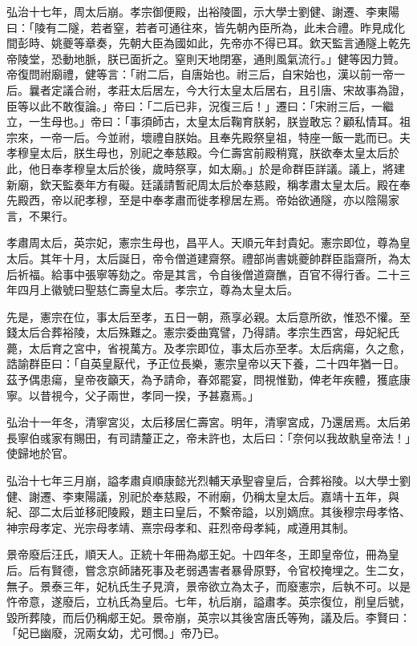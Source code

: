弘治十七年，周太后崩。孝宗御便殿，出裕陵圖，示大學士劉健、謝遷、李東陽曰：「陵有二隧，若者窒，若者可通往來，皆先朝內臣所為，此未合禮。昨見成化間彭時、姚夔等章奏，先朝大臣為國如此，先帝亦不得已耳。欽天監言通隧上乾先帝陵堂，恐動地脈，朕已面折之。窒則天地閉塞，通則風氣流行。」健等因力贊。帝復問祔廟禮，健等言：「祔二后，自唐始也。祔三后，自宋始也，漢以前一帝一后。曩者定議合祔，孝莊太后居左，今大行太皇太后居右，且引唐、宋故事為證，臣等以此不敢復論。」帝曰：「二后已非，況復三后！」遷曰：「宋祔三后，一繼立，一生母也。」帝曰：「事須師古，太皇太后鞠育朕躬，朕豈敢忘？顧私情耳。祖宗來，一帝一后。今並祔，壞禮自朕始。且奉先殿祭皇祖，特座一飯一匙而已。夫孝穆皇太后，朕生母也，別祀之奉慈殿。今仁壽宮前殿稍寬，朕欲奉太皇太后於此，他日奉孝穆皇太后於後，歲時祭享，如太廟。」於是命群臣詳議。議上，將建新廟，欽天監奏年方有礙。廷議請暫祀周太后於奉慈殿，稱孝肅太皇太后。殿在奉先殿西，帝以祀孝穆，至是中奉孝肅而徙孝穆居左焉。帝始欲通隧，亦以陰陽家言，不果行。

孝肅周太后，英宗妃，憲宗生母也，昌平人。天順元年封貴妃。憲宗即位，尊為皇太后。其年十月，太后誕日，帝令僧道建齋祭。禮部尚書姚夔帥群臣詣齋所，為太后祈福。給事中張寧等劾之。帝是其言，令自後僧道齋醮，百官不得行香。二十三年四月上徽號曰聖慈仁壽皇太后。孝宗立，尊為太皇太后。

先是，憲宗在位，事太后至孝，五日一朝，燕享必親。太后意所欲，惟恐不懽。至錢太后合葬裕陵，太后殊難之。憲宗委曲寬譬，乃得請。孝宗生西宮，母妃紀氏薨，太后育之宮中，省視萬方。及孝宗即位，事太后亦至孝。太后病瘍，久之愈，誥諭群臣曰：「自英皇厭代，予正位長樂，憲宗皇帝以天下養，二十四年猶一日。茲予偶患瘍，皇帝夜籲天，為予請命，春郊罷宴，問視惟勤，俾老年疾體，獲底康寧。以昔視今，父子兩世，孝同一揆，予甚嘉焉。」

弘治十一年冬，清寧宮災，太后移居仁壽宮。明年，清寧宮成，乃還居焉。太后弟長寧伯彧家有賜田，有司請釐正之，帝未許也，太后曰：「奈何以我故骫皇帝法！」使歸地於官。

弘治十七年三月崩，謚孝肅貞順康懿光烈輔天承聖睿皇后，合葬裕陵。以大學士劉健、謝遷、李東陽議，別祀於奉慈殿，不祔廟，仍稱太皇太后。嘉靖十五年，與紀、邵二太后並移祀陵殿，題主曰皇后，不繫帝謚，以別嫡庶。其後穆宗母孝恪、神宗母孝定、光宗母孝靖、熹宗母孝和、莊烈帝母孝純，咸遵用其制。

景帝廢后汪氏，順天人。正統十年冊為郕王妃。十四年冬，王即皇帝位，冊為皇后。后有賢德，嘗念京師諸死事及老弱遇害者暴骨原野，令官校掩埋之。生二女，無子。景泰三年，妃杭氏生子見濟，景帝欲立為太子，而廢憲宗，后執不可。以是忤帝意，遂廢后，立杭氏為皇后。七年，杭后崩，謚肅孝。英宗復位，削皇后號，毀所葬陵，而后仍稱郕王妃。景帝崩，英宗以其後宮唐氏等殉，議及后。李賢曰：「妃已幽廢，況兩女幼，尤可憫。」帝乃已。

